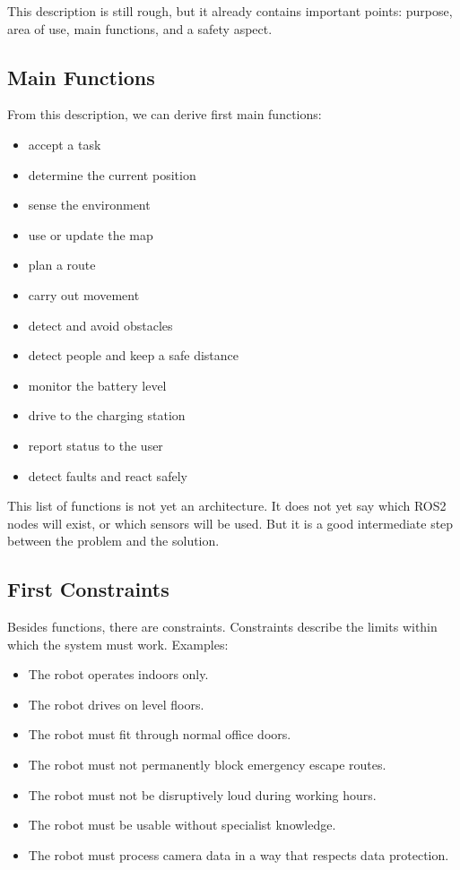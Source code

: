 This description is still rough, but it already contains important points: purpose, area of use, main functions, and a safety aspect.

\subsection{Main Functions}
From this description, we can derive first main functions:

\begin{itemize}
    \item accept a task
    \item determine the current position
    \item sense the environment
    \item use or update the map
    \item plan a route
    \item carry out movement
    \item detect and avoid obstacles
    \item detect people and keep a safe distance
    \item monitor the battery level
    \item drive to the charging station
    \item report status to the user
    \item detect faults and react safely
\end{itemize}

This list of functions is not yet an architecture. It does not yet say which ROS2 nodes will exist, or which sensors will be used. But it is a good intermediate step between the problem and the solution.

\subsection{First Constraints}
Besides functions, there are constraints. Constraints describe the limits within which the system must work. Examples:

\begin{itemize}
    \item The robot operates indoors only.
    \item The robot drives on level floors.
    \item The robot must fit through normal office doors.
    \item The robot must not permanently block emergency escape routes.
    \item The robot must not be disruptively loud during working hours.
    \item The robot must be usable without specialist knowledge.
    \item The robot must process camera data in a way that respects data protection.
\end{itemize}

